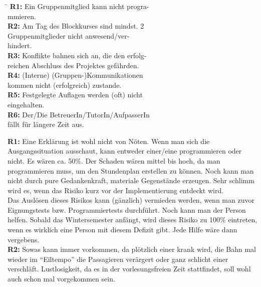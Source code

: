 \documentclass[fontsize=12pt,paper=a4,twoside]{scrartcl}
\begin{document}
\begin{tabbing}
	\hspace*{5em}\= \kill
	\textbf{R1:}\> Ein Gruppenmitglied kann nicht progra-\\
				\> mmieren.\\[0.5em]
	\textbf{R2:}\> Am Tag des Blockkurses sind mindst. 2\\
				\> Gruppenmitglieder nicht anwesend/ver-\\
				\> hindert.\\[0.5em]
	\textbf{R3:}\> Konflikte bahnen sich an, die den erfolg-\\
				\> reichen Abschluss des Projektes gefährden.\\[0.5em]
	\textbf{R4:}\> (Interne) (Gruppen-)Kommunikationen\\ 
				\> kommen nicht (erfolgreich) zustande.\\[0.5em]
	\textbf{R5:}\> Festgelegte Auflagen werden (oft) nicht\\
				\> eingehalten.\\[0.5em]
	\textbf{R6:}\> Der/Die BetreuerIn/TutorIn/AufpasserIn\\
				\> fällt für längere Zeit aus.\\[0.5em]
\end{tabbing} 

\textbf{R1:} Eine Erklärung ist wohl nicht von Nöten. Wenn man sich die Ausgangssituation ausschaut, kann entweder einer/eine programmieren oder nicht. Es wären ca. 50\%. Der Schaden wären mittel bis hoch, da man programmieren muss, um den Stundenplan erstellen zu können. Noch kann man nicht durch pure Gedankenkraft, materiale Gegenstände erzeugen. Sehr schlimm wird es, wenn das Risiko kurz vor der Implementierung entdeckt wird.\\

Das Auslösen dieses Risikos kann (gänzlich) vermieden werden, wenn man zuvor Eignungstests bzw. Programmiertests durchführt. Noch kann man der Person helfen. Sobald das Wintersemester anfängt, wird dieses Risiko zu 100\% eintreten, wenn es wirklich eine Person mit diesem Defizit gibt. Jede Hilfe wäre dann vergebens.\\ 

\textbf{R2:} Sowas kann immer vorkommen, da plötzlich einer krank wird, die Bahn mal wieder im "`Eiltempo"' die Passagieren verärgert oder ganz schlicht einer verschläft.
Lustlosigkeit, da es in der vorlesungsfreien Zeit stattfindet, soll wohl auch schon mal vorgekommen sein.\\
\end{document}
